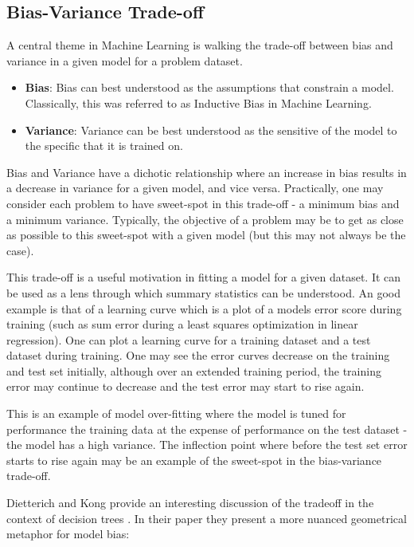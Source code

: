 \subsection{Bias-Variance Trade-off}
A central theme in Machine Learning is walking the trade-off between bias and variance in a given model for a problem dataset.

\begin{itemize}
	\item \textbf{Bias}: Bias can best understood as the assumptions that constrain a model. Classically, this was referred to as Inductive Bias in Machine Learning. 
	\item \textbf{Variance}: Variance can be best understood as the sensitive of the model to the specific that it is trained on.
\end{itemize}

Bias and Variance have a dichotic relationship where an increase in bias results in a decrease in variance for a given model, and vice versa. 
Practically, one may consider each problem to have sweet-spot in this trade-off - a minimum bias and a minimum variance. Typically, the objective of a problem may be to get as close as possible to this sweet-spot with a given model (but this may not always be the case). 

This trade-off is a useful motivation in fitting a model for a given dataset. It can be used as a lens through which summary statistics can be understood. An good example is that of a learning curve which is a plot of a models error score during training (such as sum error during a least squares optimization in linear regression). One can plot a learning curve for a training dataset and a test dataset during training. One may see the error curves decrease on the training and test set initially, although over an extended training period, the training error may continue to decrease and the test error may start to rise again.

This is an example of model over-fitting where the model is tuned for performance the training data at the expense of performance on the test dataset - the model has a high variance. The inflection point where before the test set error starts to rise again may be an example of the sweet-spot in the bias-variance trade-off.

Dietterich and Kong provide an interesting discussion of the tradeoff in the context of decision trees \cite{Dietterich1995}. In their paper they present a more nuanced geometrical metaphor for model bias:

